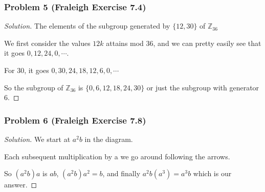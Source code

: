 \documentclass[11pt]{article}
\newcommand{\1}{\mathbf{1}}
\theoremstyle{definition}
\newenvironment{solution}{\begin{proof}[Solution]}{\end{proof}}
\begin{document}
\subsubsection*{Problem 5 (Fraleigh Exercise 7.4)}
\begin{solution}
    The elements of the subgroup generated by $\{12, 30\}$ of $\mathbb{Z}_{36}$
\par    We first consider the values $12k$ attains mod 36, and we can pretty easily see
that it goes $0, 12, 24, 0, \cdots.$
\par For 30, it goes $0, 30, 24, 18, 12, 6, 0, \cdots$ 
\par So the subgroup of $\mathbb{Z}_{36}$ is $\{0, 6, 12, 18, 24, 30\}$ or just the subgroup
with generator 6.
\end{solution}
\subsubsection*{Problem 6 (Fraleigh Exercise 7.8)}
\begin{solution}
We start at $a^2b$ in the diagram. \par Each subsequent multiplication by a we go around
following the arrows. \par So $(a^2b) a$ is $ab$, $(a^2b)a^2 = b$, and finally $a^2b(a^3) =
a^3b$ which is our answer.
\end{solution}
\end{document}

